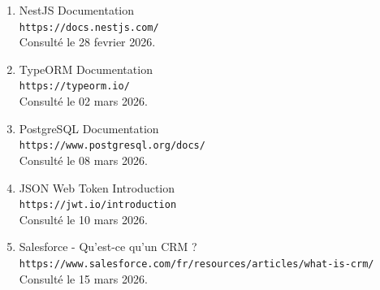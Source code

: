 \documentclass[12pt,a4paper,twoside,openany]{book}
\begin{document}
\begin{enumerate}
    \item NestJS Documentation \\
    \texttt{https://docs.nestjs.com/} \\
    Consulté le 28 fevrier 2026.

    \item TypeORM Documentation \\
    \texttt{https://typeorm.io/} \\
    Consulté le 02 mars 2026.

    \item PostgreSQL Documentation \\
    \texttt{https://www.postgresql.org/docs/} \\
    Consulté le 08 mars 2026.

    \item JSON Web Token Introduction \\
    \texttt{https://jwt.io/introduction} \\
    Consulté le 10 mars 2026.

    \item Salesforce - Qu'est-ce qu'un CRM ? \\
    \texttt{https://www.salesforce.com/fr/resources/articles/what-is-crm/} \\
    Consulté le 15 mars 2026.
\end{enumerate}
\end{document}
